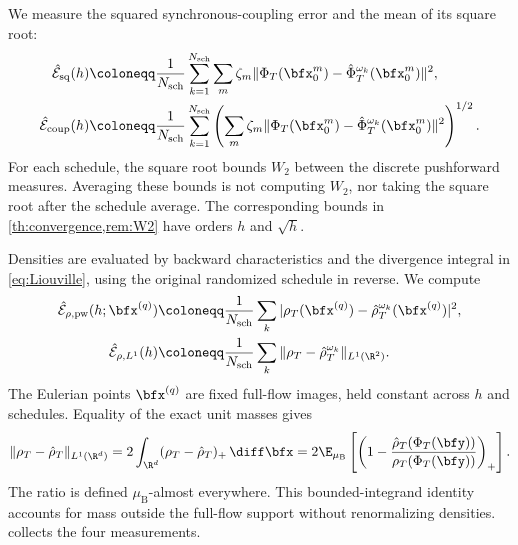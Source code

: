 We measure the squared synchronous-coupling error and the mean of its square root:
\begin{align}
\hat{\mathcal E}_{\mathrm{sq}}(h)
&\coloneqq\frac{1}{N_{\mathrm{sch}}}\sum_{k=1}^{N_{\mathrm{sch}}}
\sum_m\zeta_m\|\Phi_T(\bfx_0^m)-\hat\Phi_T^{\omega_k}(\bfx_0^m)\|^2,
\label{eq:transport_sq_error}\\
\hat{\mathcal E}_{\mathrm{coup}}(h)
&\coloneqq\frac{1}{N_{\mathrm{sch}}}\sum_{k=1}^{N_{\mathrm{sch}}}
\left(\sum_m\zeta_m\|\Phi_T(\bfx_0^m)-\hat\Phi_T^{\omega_k}(\bfx_0^m)\|^2\right)^{1/2}.
\label{eq:transport_coup_error}
\end{align}
For each schedule, the square root bounds $W_2$ between the discrete pushforward measures. Averaging these bounds is not computing $W_2$, nor taking the square root after the schedule average. The corresponding bounds in \cref{th:convergence,rem:W2} have orders $h$ and $\sqrt h$.

Densities are evaluated by backward characteristics and the divergence integral in \eqref{eq:Liouville}, using the original randomized schedule in reverse. We compute
\begin{align}
\hat{\mathcal E}_{\rho,\mathrm{pw}}(h;\bfx^{(q)})
&\coloneqq\frac{1}{N_{\mathrm{sch}}}\sum_k
|\rho_T(\bfx^{(q)})-\hat\rho_T^{\omega_k}(\bfx^{(q)})|^2,
\label{eq:transport_pointwise_error}\\
\hat{\mathcal E}_{\rho,L^1}(h)
&\coloneqq\frac{1}{N_{\mathrm{sch}}}\sum_k
\|\rho_T-\hat\rho_T^{\omega_k}\|_{L^1(\R^2)}.
\label{eq:transport_L1_error}
\end{align}
The Eulerian points $\bfx^{(q)}$ are fixed full-flow images, held constant across $h$ and schedules. Equality of the exact unit masses gives
\begin{equation}\label{eq:l1_change_of_variables}
\|\rho_T-\hat\rho_T\|_{L^1(\R^d)}
=2\int_{\R^d}(\rho_T-\hat\rho_T)_+\,\diff\bfx
=2\E_{\mu_{\mathrm B}}\left[
\left(1-\frac{\hat\rho_T(\Phi_T(\bfy))}{\rho_T(\Phi_T(\bfy))}\right)_+
\right].
\end{equation}
The ratio is defined $\mu_{\mathrm B}$-almost everywhere. This bounded-integrand identity accounts for mass outside the full-flow support without renormalizing densities.  collects the four measurements.

